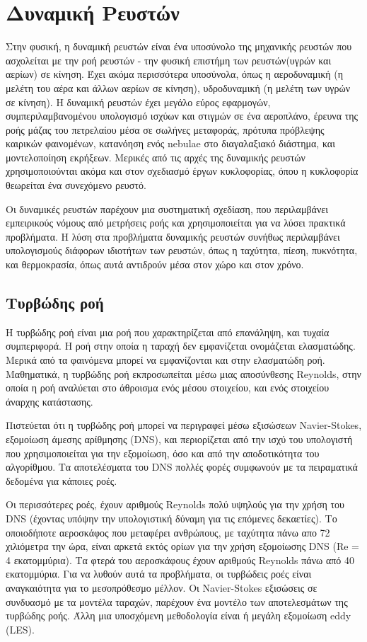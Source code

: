 \section{Δυναμική Ρευστών}
Στην φυσική, η δυναμική ρευστών είναι ένα υποσύνολο της μηχανικής ρευστών που ασχολείται με την ροή ρευστών - την φυσική επιστήμη των ρευστών(υγρών και αερίων) σε κίνηση. Έχει ακόμα περισσότερα υποσύνολα, όπως η αεροδυναμική (η μελέτη του αέρα και άλλων αερίων σε κίνηση), υδροδυναμική (η μελέτη των υγρών σε κίνηση). Η δυναμική ρευστών έχει μεγάλο εύρος εφαρμογών, συμπεριλαμβανομένου υπολογισμό ισχύων και στιγμών σε ένα αεροπλάνο, έρευνα της ροής μάζας του πετρελαίου μέσα σε σωλήνες μεταφοράς, πρότυπα πρόβλεψης καιρικών φαινομένων, κατανόηση ενός nebulae στο διαγαλαξιακό διάστημα, και μοντελοποίηση εκρήξεων. Μερικές από τις αρχές της δυναμικής ρευστών χρησιμοποιούνται ακόμα και στον σχεδιασμό έργων κυκλοφορίας, όπου η κυκλοφορία θεωρείται ένα συνεχόμενο ρευστό.\cite{fluiddynamics-1} \cite{fluiddynamics-5} 

Οι δυναμικές ρευστών παρέχουν μια συστηματική σχεδίαση, που περιλαμβάνει εμπειρικούς νόμους από μετρήσεις ροής και χρησιμοποιείται για να λύσει πρακτικά προβλήματα. Η λύση στα προβλήματα δυναμικής ρευστών συνήθως περιλαμβάνει υπολογισμούς διάφορων ιδιοτήτων των ρευστών, όπως η ταχύτητα, πίεση, πυκνότητα, και θερμοκρασία, όπως αυτά αντιδρούν μέσα στον χώρο και στον χρόνο.
\subsection{Τυρβώδης ροή}
Η τυρβώδης ροή είναι μια ροή που χαρακτηρίζεται από επανάληψη, και τυχαία συμπεριφορά. Η ροή στην οποία η ταραχή δεν εμφανίζεται ονομάζεται ελασματώδης. Μερικά από τα φαινόμενα μπορεί να εμφανίζονται και στην ελασματώδη ροή. Μαθηματικά, η τυρβώδης ροή εκπροσωπείται μέσω μιας αποσύνθεσης Reynolds, στην οποία η ροή αναλύεται στο άθροισμα ενός μέσου στοιχείου, και ενός στοιχείου άναρχης κατάστασης.

Πιστεύεται ότι η τυρβώδης ροή μπορεί να περιγραφεί μέσω εξισώσεων Navier-Stokes, εξομοίωση άμεσης αρίθμησης (DNS), και περιορίζεται από την ισχύ του υπολογιστή που χρησιμοποιείται για την εξομοίωση, όσο και από την αποδοτικότητα του αλγορίθμου. Τα αποτελέσματα του DNS πολλές φορές συμφωνούν με τα πειραματικά δεδομένα για κάποιες ροές.\cite{fluiddynamics-2} \cite{fluiddynamics-4} 

Οι περισσότερες ροές, έχουν αριθμούς Reynolds πολύ υψηλούς για την χρήση του DNS (έχοντας υπόψην την υπολογιστική δύναμη για τις επόμενες δεκαετίες). Το οποιοδήποτε αεροσκάφος που μεταφέρει ανθρώπους, με ταχύτητα πάνω απο 72 χιλιόμετρα την ώρα, είναι αρκετά εκτός ορίων για την χρήση εξομοίωσης DNS (Re = 4 εκατομμύρια). Τα φτερά του αεροσκάφους έχουν αριθμούς Reynolds πάνω από 40 εκατομμύρια. Για να λυθούν αυτά τα προβλήματα, οι τυρβώδεις ροές είναι αναγκαιότητα για το μεσοπρόθεσμο μέλλον. Οι Navier-Stokes εξισώσεις σε συνδυασμό με τα μοντέλα ταραχών, παρέχουν ένα μοντέλο των αποτελεσμάτων της τυρβώδης ροής. Άλλη μια υποσχόμενη μεθοδολογία είναι ή μεγάλη εξομοίωση eddy (LES).

